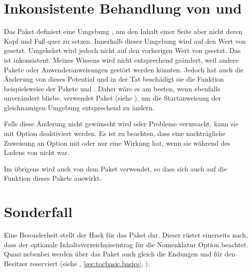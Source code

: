 \section{Inkonsistente Behandlung von  und }

Das Paket
%
 definiert eine Umgebung
, um den Inhalt einer Seite aber
nicht deren Kopf und Fuß quer zu setzen. Innerhalb dieser Umgebung wird
 auf den Wert von
 gesetzt. Umgekehrt wird jedoch  nicht auf
den vorherigen Wert von  gesetzt. Das ist
inkonsistent. Meines Wissens wird  nicht entsprechend
geändert, weil andere Pakete oder Anwenderanweisungen gestört werden
könnten. Jedoch hat auch die Änderung von  dieses Potential
und in der Tat beschädigt sie die Funktion beispielsweise der Pakete
 und
. Daher wäre es am besten, wenn
 ebenfalls unverändert bliebe.  verwendet
Paket  (siehe \cite{package:xpatch}), um die Startanweisung
 der gleichnamigen Umgebung entsprechend zu ändern.

Falls diese Änderung nicht gewünscht wird oder Probleme verursacht, kann sie
mit Option
deaktiviert werden. Es ist zu beachten, dass eine
nachträgliche Zuweisung an Option  mit
 oder
 nur eine Wirkung
hat, wenn sie während des Ladens von  nicht 
war.

Im übrigens wird  auch von dem Paket
%
 verwendet, so dass  sich auch
auf die Funktion dieses Pakets auswirkt.%


\section{Sonderfall }

Eine Besonderheit stellt der Hack für das
Paket
dar. Dieser rüstet einerseits nach, dass der optionale
Inhaltsverzeichniseintrag für die Nomenklatur Option
 beachtet. Quasi nebenbei
werden über das Paket  auch gleich die Endungen 
und  für den Besitzer  reserviert (siehe
, \autoref{sec:tocbasic.basics},
).

